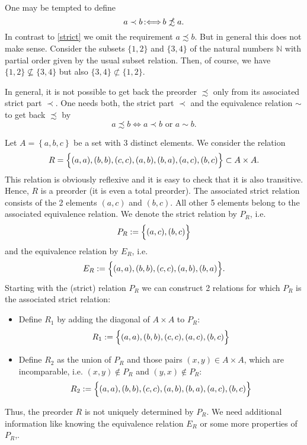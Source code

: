 ﻿\documentclass[a4paper,11pt,final]{article}
\newcommand{\nprecsim}{\mathrel{\ooalign{$\precsim$\cr
  \hidewidth\raise.225ex\hbox{$\slash\mkern2mu$}\cr}}\xspace}
\newcommand{\defby}{\mbox{\ensuremath{\,:\Longleftrightarrow\,}}\xspace}
\numberwithin{equation}{subsection}
\begin{document}
\begin{rem}\label{complement}
One may be tempted to define
\begin{equation*}
a \prec b\defby b \nprecsim a.
\end{equation*}
In contrast to \ref{strict} we omit the requirement $a\precsim b$. But in general this does not make sense. Consider the subsets $\{1,2\}$ and $\{3,4\}$ of the natural numbers $\mathbb{N}$ with partial order given by the usual subset relation. Then, of course, we have $\{1,2\}\nsubseteq \{3,4\}$ but also $\{3,4\}\nsubset\{1,2\}$.
\end{rem}

In general, it is not possible to get back the preorder $\precsim$ only from its associated strict part $\prec$. One needs both, the strict part $\prec$ and the equivalence relation $\sim$ to get back $\precsim$ by
\begin{equation*}
a \precsim b \Longleftrightarrow a \prec b \text{ or } a \sim b.
\end{equation*}

\begin{exam}\label{reconstruct}
Let $A=\left\{a,b,c\right\}$ be a set with 3 distinct elements. We consider the relation
\begin{equation*}
R=\Bigl\{(a,a),(b,b),(c,c),(a,b),(b,a),(a,c),(b,c)\Bigr\}\subset A\times A.
\end{equation*}
This relation is obviously reflexive and it is easy to check that it is also transitive. Hence, $R$ is a preorder (it is even a total preorder). The associated strict relation consists of the 2 elements $(a,c)$ and $(b,c)$. All other 5 elements belong to the associated equivalence relation. We denote the strict relation by $P_R$, i.e.
\begin{equation*}
P_R:=\Bigl\{(a,c),(b,c)\Bigr\}
\end{equation*}
and the equivalence relation by $E_R$, i.e.
\begin{equation*}
E_R:=\Bigl\{(a,a),(b,b),(c,c),(a,b),(b,a)\Bigr\}.
\end{equation*}
Starting with the (strict) relation $P_R$ we can construct 2 relations for which $P_R$ is the associated strict relation:
\begin{itemize}
\item Define $R_1$ by adding the diagonal of $A\times A$ to $P_R$:
\begin{equation*}
R_1:=\Bigl\{(a,a),(b,b),(c,c),(a,c),(b,c)\Bigr\}
\end{equation*}
\item Define $R_2$ as the union of $P_R$ and those pairs $(x,y)\in A\times A$, which are incomparable, i.e. $(x,y)\notin P_R$ and $(y,x)\notin P_R$:
\begin{equation*}
R_2:=\Bigl\{(a,a),(b,b),(c,c),(a,b),(b,a),(a,c),(b,c)\Bigr\}
\end{equation*}
\end{itemize}
Thus, the preorder $R$ is not uniquely determined by $P_R$. We need additional information like knowing the equivalence relation $E_R$ or some more properties of $P_R$,.
\end{exam}
\end{document}

